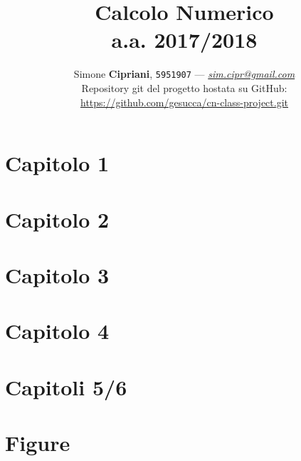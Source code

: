 \documentclass[a4paper]{article}
\date{}
\begin{document}
\title{
	\vspace{3cm}
	\textbf{Calcolo Numerico}
	\\
	a.a. 2017/2018
	\vspace{1.5cm}
}

\author{
	Simone \textbf{Cipriani}, \texttt{5951907} --- \href{mailto:sim.cipr@gmail.com}{\textit{sim.cipr@gmail.com}}
	\vspace{1cm}
	\\
	Repository git del progetto hostata su GitHub:
	\\
	\url{https://github.com/gesucca/cn-class-project.git}
}

\maketitle
\newpage
\tableofcontents


\newpage
\section{\textbf{Capitolo 1}}
%

\newpage
\section{\textbf{Capitolo 2}}
%

\newpage
\section{\textbf{Capitolo 3}}
%

\newpage
\section{\textbf{Capitolo 4}}
%

\newpage
\section{\textbf{Capitoli 5/6}}
%
\newpage
{}
\section{\textbf{Figure}}
%
\end{document}
